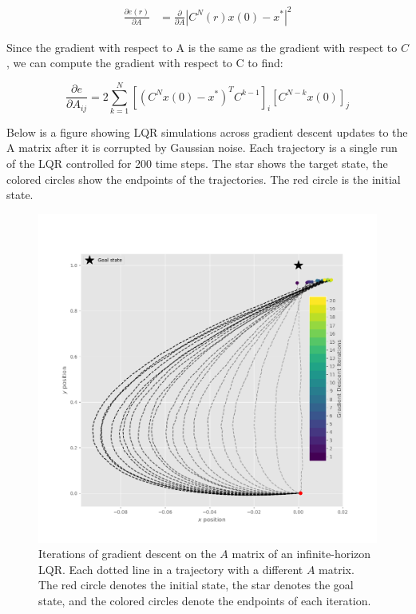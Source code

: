 \documentclass[
  a4paper,
]{article}
\begin{document}
\[
\begin{aligned}
\frac{\partial{e(r)}}{\partial{A}} &= \frac{\partial{}}{\partial{A}}{|C^N(r)x(0) - x^*|^2}
\end{aligned}
\]

Since the gradient with respect to A is the same as the gradient with
respect to \(C\), we can compute the gradient with respect to C to find:

\[
\frac{\partial{e}}{\partial{A_{ij}}} = 2\sum_{k=1}^N\left[(C^Nx(0) - x^*)^TC^{k-1}\right]_i\left[C^{N-k}x(0)\right]_j
\]

Below is a figure showing LQR simulations across gradient descent
updates to the A matrix after it is corrupted by Gaussian noise. Each
trajectory is a single run of the LQR controlled for 200 time steps. The
star shows the target state, the colored circles show the endpoints of
the trajectories. The red circle is the initial state.

\begin{figure}
\hypertarget{fig:gradient_descent}{%
\centering
\includegraphics{images/simulations/gradient_descent_on_A.png}
\caption{Iterations of gradient descent on the \(A\) matrix of an
infinite-horizon LQR. Each dotted line in a trajectory with a different
\(A\) matrix. The red circle denotes the initial state, the star denotes
the goal state, and the colored circles denote the endpoints of each
iteration.}\label{fig:gradient_descent}
}
\end{figure}
\end{document}
